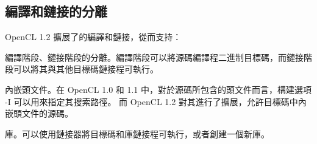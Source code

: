 \subsection{編譯和鏈接的分離}

OpenCL 1.2 擴展了的編譯和鏈接，從而支持：
\startigBase
\item 編譯階段、鏈接階段的分離。編譯階段可以將源碼編譯程二進制目標碼，而鏈接階段可以將其與其他目標碼鏈接程可執行。

\item 內嵌頭文件。在 OpenCL 1.0 和 1.1 中，對於源碼所包含的頭文件而言，構建選項 -I 可以用來指定其搜索路徑。
而 OpenCL 1.2 對其進行了擴展，允許目標碼中內嵌頭文件的源碼。

\item 庫。可以使用鏈接器將目標碼和庫鏈接程可執行，或者創建一個新庫。
\stopigBase



